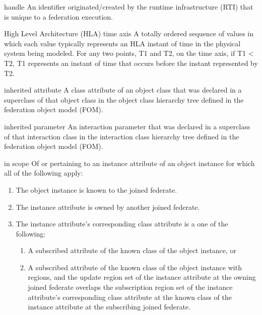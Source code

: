 \begin{definition}{handle}
    An identifier originated/created by the runtime infrastructure (RTI) that is unique to a federation execution.
\end{definition}

\begin{definition}{High Level Architecture (HLA) time axis}
    A totally ordered sequence of values in which each value typically represents an HLA instant of time in the physical system being modeled. For any two points, T1 and T2, on the time axis, if T1 \textless{} T2, T1 represents an instant of time that occurs before the instant represented by T2.
\end{definition}

\begin{definition}{inherited attribute}
    A class attribute of an object class that was declared in a superclass of that object class in the object class hierarchy tree defined in the federation object model (FOM).
\end{definition}

\begin{definition}{inherited parameter}
    An interaction parameter that was declared in a superclass of that interaction class in the interaction class hierarchy tree defined in the federation object model (FOM).
\end{definition}

\begin{definition}{in scope}
    Of or pertaining to an instance attribute of an object instance for which all of the following apply:
\end{definition}

\begin{enumerate}[label=\alph*)]
\item The object instance is known to the joined federate.
\item The instance attribute is owned by another joined federate.
\item The instance attribute's corresponding class attribute is a one of the following:
\begin{enumerate}[label=\arabic*)]
\item A subscribed attribute of the known class of the object instance, or
\item A subscribed attribute of the known class of the object instance with regions, and the update region set of the instance attribute at the owning joined federate overlaps the subscription region set of the instance attribute's corresponding class attribute at the known class of the instance attribute at the subscribing joined federate.
\par{}
\end{enumerate}
\end{enumerate}

